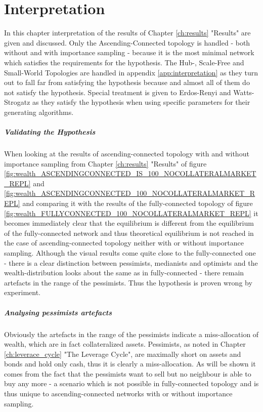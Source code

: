 \documentclass[Bachelorarbeit.tex]{subfiles}
\begin{document}
\graphicspath{{./figures/interpretation/}}	%

\chapter{Interpretation}
In this chapter interpretation of the results of Chapter \ref{ch:results} "Results" are given and discussed. Only the Ascending-Connected topology is handled - both without and with importance sampling - because it is the most minimal network which satisfies the requirements for the hypothesis. The Hub-, Scale-Free and Small-World Topologies are handled in appendix \ref{app:interpretation} as they turn out to fall far from satisfying the hypothesis because and almost all of them do not satisfy the hypothesis. Special treatment is given to Erdos-Renyi and Watts-Strogatz as they satisfy the hypothesis when using specific parameters for their generating algorithms.

\paragraph{Validating the Hypothesis}
When looking at the results of ascending-connected topology with and without importance sampling from Chapter \ref{ch:results} "Results" of figure \ref{fig:wealth_ASCENDINGCONNECTED_IS_100_NOCOLLATERALMARKET_REPL} and \ref{fig:wealth_ASCENDINGCONNECTED_100_NOCOLLATERALMARKET_REPL} and comparing it with the results of the fully-connected topology of figure \ref{fig:wealth_FULLYCONNECTED_100_NOCOLLATERALMARKET_REPL} it becomes immediately clear that the equilibrium is different from the equilibrium of the fully-connected network and thus theoretical equilibrium is not reached in the case of ascending-connected topology neither with or without importance sampling. Although the visual results come quite close to the fully-connected one - there is a clear distinction between pessimists, medianists and optimists and the wealth-distribution looks about the same as in fully-connected - there remain artefacts in the range of the pessimists. Thus the hypothesis is proven wrong by experiment.

\paragraph{Analysing pessimists artefacts}
Obviously the artefacts in the range of the pessimists indicate a miss-allocation of wealth, which are in fact collateralized assets. Pessimists, as noted in Chapter \ref{ch:leverace_cycle} "The Leverage Cycle", are maximally short on assets and bonds and hold only cash, thus it is clearly a miss-allocation. As will be shown it comes from the fact that the pessimists want to sell but no neighbour is able to buy any more - a scenario which is not possible in fully-connected topology and is thus unique to ascending-connected networks with or without importance sampling.
\end{document}
